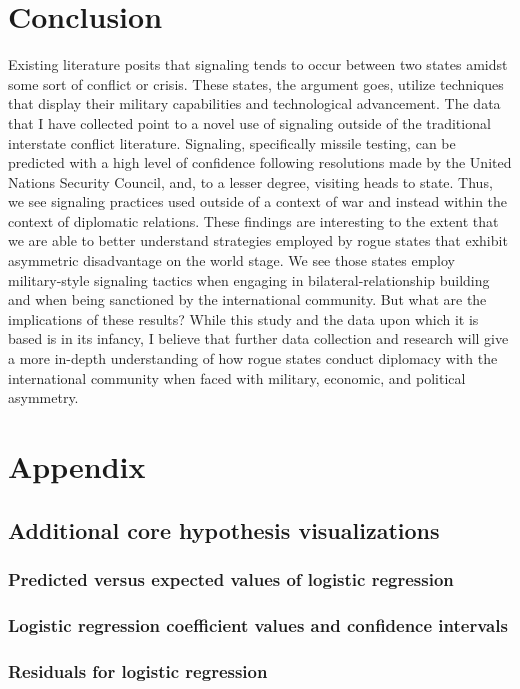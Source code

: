 \documentclass[12pt]{article}
\begin{document}
\section{Conclusion}
Existing literature posits that signaling tends to occur between two states amidst some sort of conflict or crisis. These states, the argument goes, utilize techniques that display their military capabilities and technological advancement. The data that I have collected point to a novel use of signaling outside of the traditional interstate conflict literature. Signaling, specifically missile testing, can be predicted with a high level of confidence following resolutions made by the United Nations Security Council, and, to a lesser degree, visiting heads to state. Thus, we see signaling practices used outside of a context of war and instead within the context of diplomatic relations. These findings are interesting to the extent that we are able to better understand strategies employed by rogue states that exhibit asymmetric disadvantage on the world stage. We see those states employ military-style signaling tactics when engaging in bilateral-relationship building and when being sanctioned by the international community. But what are the implications of these results? While this study and the data upon which it is based is in its infancy, I believe that further data collection and research will give a more in-depth understanding of how rogue states conduct diplomacy with the international community when faced with military, economic, and political asymmetry. 

\section{Appendix}
\subsection{Additional core hypothesis visualizations}
\subsubsection{Predicted versus expected values of logistic regression}
\subsubsection{Logistic regression coefficient values and confidence intervals}
\subsubsection{Residuals for logistic regression}
\end{document}
